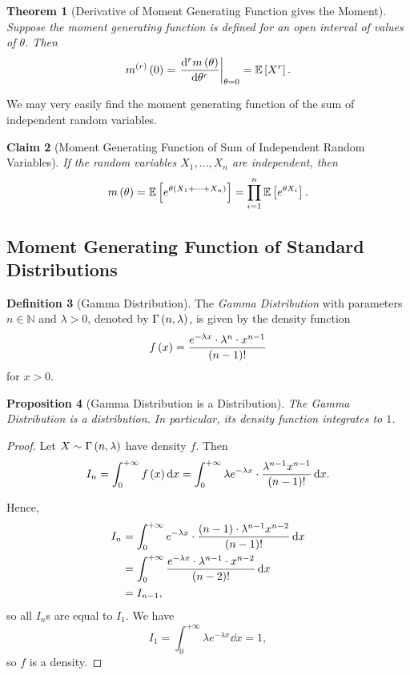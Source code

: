 \documentclass{article}
\newtheorem{theorem}{Theorem}[section]
\newtheorem{proposition}[theorem]{Proposition}
\newtheorem{claim}[theorem]{Claim}
\theoremstyle{definition}
\newtheorem{definition}[theorem]{Definition}
\theoremstyle{remark}
\newcommand{\NN}{\mathbb{N}}
\newcommand{\Expt}{\mathbb{E}}
\newcommand{\plusinfty}{+\infty}
\newcommand{\rightbar}[1]{\left.#1\right|}
\begin{document}
\begin{theorem}[Derivative of Moment Generating Function gives the Moment]
    \label{thm:derivative-mgf-moment}%
    Suppose the moment generating function is defined for an open interval of values of \(\theta\). Then
    \[
        m^{\pqty{r}} \pqty{0} = \rightbar{\dv[r]{m\pqty{\theta}}{\theta}}_{\theta = 0} = \Expt\bqty{X^r}.
    \]
\end{theorem}

We may very easily find the moment generating function of the sum of independent random variables.

\begin{claim}[Moment Generating Function of Sum of Independent Random Variables]
    \label{claim:mgf-sum-independent}%
    If the random variables \(X_1, \ldots, X_n\) are independent, then
    \[
        m\pqty{\theta} = \Expt\bqty{e^{\theta \pqty{X_1 + \cdots + X_n}}} = \prod_{i = 1}^{n} \Expt\bqty{e^{\theta X_i}}.
    \]
\end{claim}

\subsection{Moment Generating Function of Standard Distributions}

\begin{definition}[Gamma Distribution]
    \label{def:gamma-distribution}%
    The \emph{Gamma Distribution} with parameters \(n \in \NN\) and \(\lambda > 0\), denoted by \(\Gamma\left(n, \lambda\right)\), is given by the density function
    \[
        f\left(x\right) = \frac{e^{-\lambda x} \cdot \lambda^n \cdot x^{n - 1}}{\left(n - 1\right)!}
    \]
    for \(x > 0\).
\end{definition}

\begin{proposition}[Gamma Distribution is a Distribution]
    \label{prop:gamma-distribution-integral}%
    The Gamma Distribution is a distribution. In particular, its density function integrates to \(1\).
\end{proposition}

\begin{proof}
    Let \(X \sim \Gamma\left(n, \lambda\right)\) have density \(f\). Then
    \[
        I_n = \int_{0}^{\plusinfty} f\pqty{x} \dd{x} = \int_{0}^{\plusinfty}  \lambda e^{-\lambda x} \cdot \frac{\lambda^{n - 1} x^{n - 1}}{\pqty{n - 1}!} \dd{x}.
    \]

    Hence,
    \begin{align*}
        I_n &= \int_{0}^{\plusinfty} e^{-\lambda x} \cdot \frac{\pqty{n - 1} \cdot \lambda^{n - 1} x^{n - 2}}{\pqty{n - 1}!} \dd{x} \\
        &= \int_{0}^{\plusinfty} \frac{e^{-\lambda x} \cdot \lambda^{n - 1} \cdot x^{n - 2}}{\pqty{n - 2}!} \dd{x} \\
        &= I_{n - 1},
    \end{align*}
    so all \(I_n\)s are equal to \(I_1\). We have
    \[
        I_1 = \int_{0}^{\plusinfty} \lambda e^{-\lambda x} \dd{x} = 1,
    \]
    so \(f\) is a density.
\end{proof}
\end{document}

